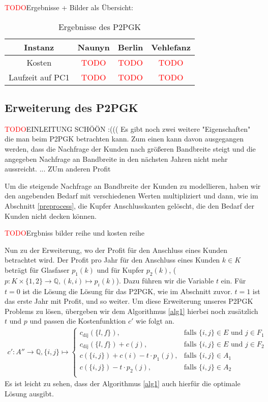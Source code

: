 \documentclass[11pt,a4paper]{article}
\newcommand{\Q}{\mathbb{Q}}
\newcommand{\TODO}{\textcolor{red}{TODO}}
\theoremstyle{my_th_style1}
\begin{document}
\TODO Ergebnisse + Bilder als Übersicht:
\begin{table}[h]
	\centering
	\begin{tabular}{c|c|c|c}
		Instanz & Naunyn & Berlin & Vehlefanz \\	
		\hline
		Kosten & \TODO & \TODO & \TODO\\
		Laufzeit auf PC1 & \TODO & \TODO & \TODO\\
	\end{tabular}
	\label{P2PGK}
	\caption{Ergebnisse des P2PGK} 
\end{table}

\subsection{Erweiterung des P2PGK}
\TODO EINLEITUNG SCHÖÖN :(((
Es gibt noch zwei weitere "Eigenschaften" die man beim P2PGK betrachten kann. Zum einen kann davon ausgegangen werden, dass die Nachfrage der Kunden nach größeren Bandbreite steigt und die angegeben Nachfrage an Bandbreite in den nächsten Jahren nicht mehr aussreicht. ... ZUm anderen Profit

Um die steigende Nachfrage an Bandbreite der Kunden zu modellieren, haben wir den angebenden Bedarf mit verschiedenen Werten multipliziert und dann, wie im Abschnitt \ref{preprocess}, die Kupfer Anschlusskanten gelöscht, die den Bedarf der Kunden nicht decken können.

\TODO Ergbniss bilder reihe und kosten reihe

Nun zu der Erweiterung, wo der Profit für den Anschluss eines Kunden  betrachtet wird.
Der Profit pro Jahr für den Anschluss eines Kunden $k \in K$ beträgt für Glasfaser $p_1(k)$ und für Kupfer $p_2(k)$, ($p:K \times \{1,2\} \rightarrow \Q,(k,i) \mapsto p_i(k)$). Dazu führen wir die Variable $t$ ein. Für $t=0$ ist die Lösung die Lösung für das P2PGK, wie im Abschnitt zuvor. $t=1$ ist das erste Jahr mit Profit, und so weiter. Um diese Erweiterung unseres P2PGK Problems zu lösen, übergeben wir dem Algorithmus  \ref{alg1} hierbei noch zusätzlich $t$ und $p$ und passen die Kostenfunktion $c'$ wie folgt an.
\begin{align*}
c': A'' \rightarrow \Q, \{ i,j \} \mapsto \left\{\begin{array}{cl} 
c_{\text{dij}}(\{l,f\}), & \text{falls } \{i,j\} \in E \text{ und } j \in F_1\\ 
c_{\text{dij}}(\{l,f\})+c(j), & \text{falls } \{i,j\} \in E \text{ und } j \in F_2\\ 
c(\{i,j\}) + c(i) - t \cdot p_1(j), & \text{falls } \{i,j\} \in A_1\\ 
c(\{i,j\}) - t \cdot p_2(j), & \text{falls } \{i,j\} \in A_2\\ 
\end{array}
\right.
\end{align*}
Es ist leicht zu sehen, dass der Algorithmus \ref{alg1} auch hierfür die optimale Lösung ausgibt. 
\end{document}
